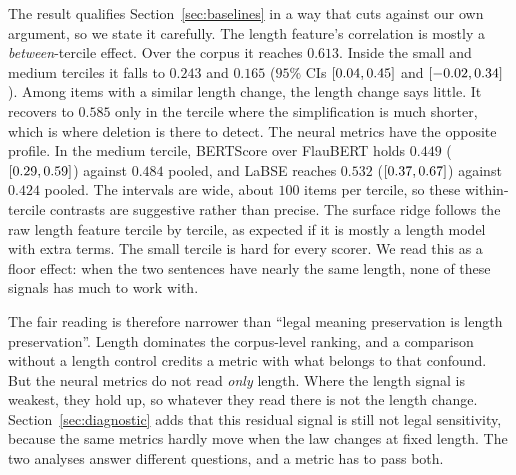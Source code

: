 \documentclass{BVP_JCLLT}
\newcommand{\rev}[1]{#1}
\newcommand{\rev}[1]{{\color{revcol}#1}}
\begin{document}
\begin{table}
\centering
\caption{\rev{Correlation with the human label \emph{within} terciles of the
absolute length change. For the length feature and the three unsupervised
metrics, every column uses all $297$ items, and the \emph{all} column equals
the full-corpus value. For the surface ridge and the trained JudgeBERT-Scalar,
every column pools the out-of-fold test predictions over seeds. A tercile
removes most of the length variance. A metric that measures legal meaning should
therefore lose far less correlation there than one that measures deletion.}}\label{tab:buckets}
\small

\end{table}

\rev{The result qualifies Section~\ref{sec:baselines} in a way that cuts against
our own argument, so we state it carefully. The length feature's correlation is
mostly a \emph{between}-tercile effect. Over the corpus it reaches $0.613$. Inside the small and medium
terciles it falls to $0.243$ and $0.165$ ($95\%$ CIs $[0.04,
0.45]$ and $[-0.02, 0.34]$). Among items with a similar length change, the length
change says little. It recovers to $0.585$ only in the tercile where the
simplification is much shorter, which is where deletion is there to detect. The
neural metrics have the opposite profile. In the medium tercile, BERTScore over
FlauBERT holds $0.449$ ($[0.29, 0.59]$) against $0.484$ pooled, and
LaBSE reaches $0.532$ ($[0.37, 0.67]$) against $0.424$ pooled. The
intervals are wide, about $100$ items per tercile, so these within-tercile
contrasts are suggestive rather than precise. The surface ridge follows the raw
length feature tercile by tercile, as expected if it is mostly a length model
with extra terms. The small tercile is hard for every scorer. We read this as a
floor effect: when the two sentences have nearly the same length, none of these
signals has much to work with.

The fair reading is therefore narrower than ``legal meaning preservation is
length preservation''. Length dominates the corpus-level ranking, and a
comparison without a length control credits a metric with what belongs to that
confound. But the neural metrics do not read \emph{only} length. Where the
length signal is weakest, they hold up, so whatever they read there is not the
length change. Section~\ref{sec:diagnostic} adds that this residual signal is
still not legal sensitivity, because the same metrics hardly move when the law
changes at fixed length. The two analyses answer different questions, and a
metric has to pass both.}
\end{document}
